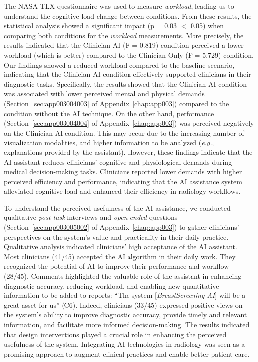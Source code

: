 The \ac{NASA-TLX} questionnaire was used to measure {\it workload}, leading us to understand the cognitive load change between conditions.
From these results, the statistical analysis showed a significant impact (p = 0.03 $<$ 0.05) when comparing both conditions for the {\it workload} measurements.
More precisely, the results indicated that the Clinician-AI (F = 0.819) condition perceived a lower workload (which is better) compared to the Clinician-Only (F = 5.729) condition.
Our findings showed a reduced workload compared to the baseline scenario, indicating that the Clinician-AI condition effectively supported clinicians in their diagnostic tasks.
Specifically, the results showed that the Clinician-AI condition was associated with lower perceived mental and physical demands (Section~\ref{sec:app003004003} of Appendix~\ref{chap:app003}) compared to the condition without the \ac{AI} technique.
On the other hand, performance (Section~\ref{sec:app003004004} of Appendix~\ref{chap:app003}) was perceived negatively on the Clinician-AI condition.
This may occur due to the increasing number of visualization modalities, and higher information to be analyzed ({\it e.g.}, explanations provided by the assistant).
However, these findings indicate that the \ac{AI} assistant reduces clinicians' cognitive and physiological demands during medical decision-making tasks.
Clinicians reported lower demands with higher perceived efficiency and performance, indicating that the \ac{AI} assistance system alleviated cognitive load and enhanced their efficiency in radiology workflows.

To understand the perceived usefulness of the \ac{AI} assistance, we conducted qualitative {\it post-task} interviews and {\it open-ended} questions (Section~\ref{sec:app003005002} of Appendix~\ref{chap:app003}) to gather clinicians' perspectives on the system's value and practicality in their daily practice.
Qualitative analysis indicated clinicians' high acceptance of the \ac{AI} assistant.
Most clinicians (41/45) accepted the \ac{AI} algorithm in their daily work.
They recognized the potential of \ac{AI} to improve their performance and workflow (28/45).
Comments highlighted the valuable role of the assistant in enhancing diagnostic accuracy, reducing workload, and enabling new quantitative information to be added to reports: ``The system [{\it BreastScreening-AI}] will be a great asset for us'' (C6).
Indeed, clinicians (33/45) expressed positive views on the system's ability to improve diagnostic accuracy, provide timely and relevant information, and facilitate more informed decision-making.
The results indicated that design interventions played a crucial role in enhancing the perceived usefulness of the system.
Integrating \ac{AI} technologies in radiology was seen as a promising approach to augment clinical practices and enable better patient care.

